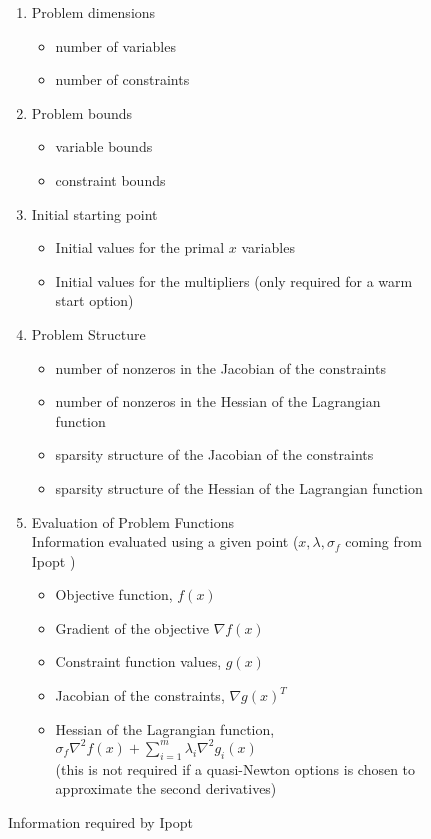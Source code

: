 \documentclass[10pt]{article}
\newcommand{\Ipopt}{{\sc Ipopt }}
\begin{document}
\begin{figure}
\begin{enumerate}
\item Problem dimensions \label{it.prob_dim}
  \begin{itemize}
  \item number of variables
  \item number of constraints
  \end{itemize}
\item Problem bounds
  \begin{itemize}
  \item variable bounds
  \item constraint bounds
  \end{itemize}
\item Initial starting point
  \begin{itemize}
  \item Initial values for the primal $x$ variables
  \item Initial values for the multipliers (only
    required for a warm start option)
  \end{itemize}
\item Problem Structure \label{it.prob_struct}
  \begin{itemize}
  \item number of nonzeros in the Jacobian of the constraints
  \item number of nonzeros in the Hessian of the Lagrangian function
  \item sparsity structure of the Jacobian of the constraints
  \item sparsity structure of the Hessian of the Lagrangian function
  \end{itemize}
\item Evaluation of Problem Functions \label{it.prob_eval} \\
  Information evaluated using a given point ($x,
  \lambda, \sigma_f$ coming from \Ipopt)
  \begin{itemize}
  \item Objective function, $f(x)$
  \item Gradient of the objective $\nabla f(x)$
  \item Constraint function values, $g(x)$
  \item Jacobian of the constraints, $\nabla g(x)^T$
  \item Hessian of the Lagrangian function, 
    $\sigma_f \nabla^2 f(x) + \sum_{i=1}^m\lambda_i\nabla^2
    g_i(x)$ \\
    (this is not required if a quasi-Newton options is chosen to
    approximate the second derivatives)
  \end{itemize}
\end{enumerate}
\caption{Information required by \Ipopt}
\label{fig.required_info}
\end{figure}
\end{document}

